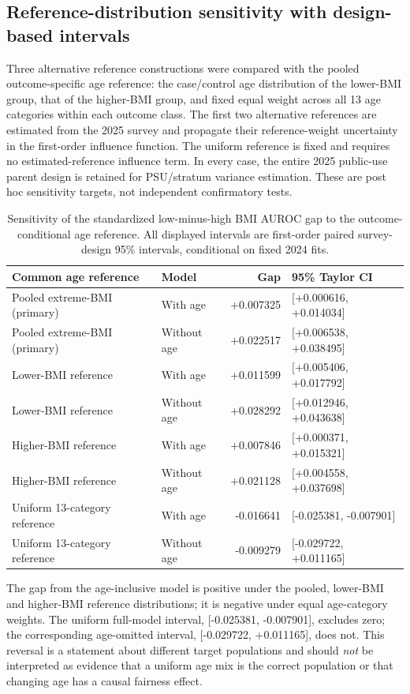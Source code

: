 \subsection{Reference-distribution sensitivity with design-based intervals}
Three alternative reference constructions were compared with the pooled outcome-specific age reference: the case/control age distribution of the lower-BMI group, that of the higher-BMI group, and fixed equal weight across all 13 age categories within each outcome class. The first two alternative references are estimated from the 2025 survey and propagate their reference-weight uncertainty in the first-order influence function. The uniform reference is fixed and requires no estimated-reference influence term. In every case, the entire 2025 public-use parent design is retained for PSU/stratum variance estimation. These are post hoc sensitivity targets, not independent confirmatory tests.
\begin{table}[htbp]\centering\footnotesize
\caption{Sensitivity of the standardized low-minus-high BMI AUROC gap to the outcome-conditional age reference. All displayed intervals are first-order paired survey-design 95\% intervals, conditional on fixed 2024 fits.}\label{tab:age-references-expanded}
\setlength{\tabcolsep}{4pt}\begin{tabular}{llrl}\toprule
Common age reference & Model & Gap & 95\% Taylor CI \\\midrule
Pooled extreme-BMI (primary) & With age & +0.007325 & [+0.000616, +0.014034] \\
Pooled extreme-BMI (primary) & Without age & +0.022517 & [+0.006538, +0.038495] \\
Lower-BMI reference & With age & +0.011599 & [+0.005406, +0.017792] \\
Lower-BMI reference & Without age & +0.028292 & [+0.012946, +0.043638] \\
Higher-BMI reference & With age & +0.007846 & [+0.000371, +0.015321] \\
Higher-BMI reference & Without age & +0.021128 & [+0.004558, +0.037698] \\
Uniform 13-category reference & With age & -0.016641 & [-0.025381, -0.007901] \\
Uniform 13-category reference & Without age & -0.009279 & [-0.029722, +0.011165] \\
\bottomrule\end{tabular}\end{table}
The gap from the age-inclusive model is positive under the pooled, lower-BMI and higher-BMI reference distributions; it is negative under equal age-category weights. The uniform full-model interval, [-0.025381, -0.007901], excludes zero; the corresponding age-omitted interval, [-0.029722, +0.011165], does not. This reversal is a statement about different target populations and should \emph{not} be interpreted as evidence that a uniform age mix is the correct population or that changing age has a causal fairness effect.
